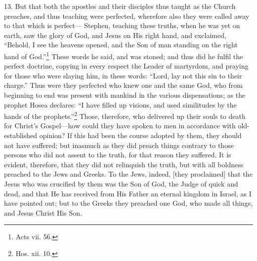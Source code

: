 13. But that both the apostles and their disciples thus taught as the Church preaches, and thus teaching were perfected, wherefore also they were called away to that which is perfect— Stephen, teaching these truths, when he was yet on earth, saw the glory of God, and Jesus on His right hand, and exclaimed, “Behold, I see the heavens opened, and the Son of man standing on the right hand of God.”\footnote{Acts vii. 56.} These words he said, and was stoned; and thus did he fulfil the perfect doctrine, copying in every respect the Leader of martyrdom, and praying for those who were slaying him, in these words: “Lord, lay not this sin to their charge.” Thus were they perfected who knew one and the same God, who from beginning to end was present with mankind in the various dispensations; as the prophet Hosea declares: “I have filled up visions, and used similitudes by the hands of the prophets.”\footnote{Hos. xii. 10.} Those, therefore, who delivered up their souls to death for Christ’s Gospel—how could they have spoken to men in accordance with old-established opinion? If this had been the course adopted by them, they should not have suffered; but inasmuch as they did preach things contrary to those persons who did not assent to the truth, for that reason they suffered. It is evident, therefore, that they did not relinquish the truth, but with all boldness preached to the Jews and Greeks. To the Jews, indeed, [they proclaimed] that the Jesus who was crucified by them was the Son of God, the Judge of quick and dead, and that He has received from His Father an eternal kingdom in Israel, as I have pointed out; but to the Greeks they preached one God, who made all things, and Jesus Christ His Son.

